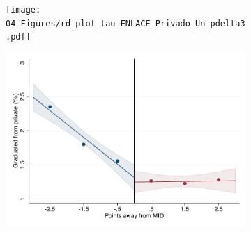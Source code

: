 \documentclass[oneside,11pt]{article}
\begin{document}
\begin{figure}[H]
\begin{center}
    \begin{subfigure}{0.475\textwidth}
        \centering
        \texttt{[image: 04\_Figures/rd\_plot\_tau\_ENLACE\_Privado\_Un\_pdelta3.pdf]}
    \end{subfigure}
    \begin{subfigure}{0.475\textwidth}
        \centering
        \includegraphics[width=\textwidth]{04_Figures/rd_plot_mid_ENLACE_Privado_Un_pdelta3.pdf}
    \end{subfigure}


\end{center}
\end{figure}
\end{document}
